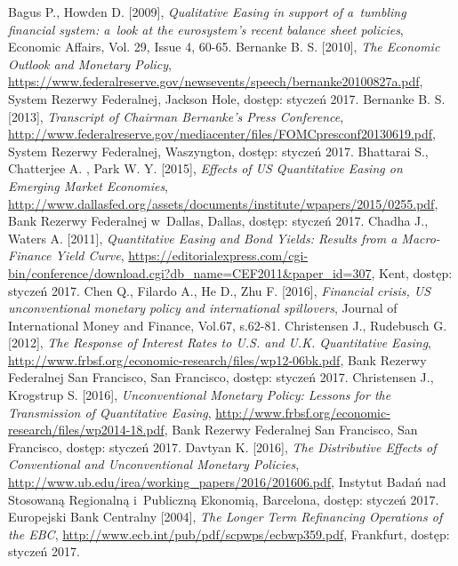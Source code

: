 \begin{thebibliography}{7}
	Bagus P., Howden D. [2009], 
	\emph{Qualitative Easing in support of a~tumbling financial system: a~look at the eurosystem's recent balance sheet policies}, Economic Affairs, Vol. 29, Issue 4, 60-65.	 
	Bernanke B. S. [2010],
	\emph{The Economic Outlook and Monetary Policy}, \url{https://www.federalreserve.gov/newsevents/speech/bernanke20100827a.pdf},
	 System Rezerwy Federalnej, Jackson Hole, dostęp: styczeń 2017.
	Bernanke B. S. [2013],
	\emph{Transcript of Chairman Bernanke’s Press Conference}, \url{http://www.federalreserve.gov/mediacenter/files/FOMCpresconf20130619.pdf},
	 System Rezerwy Federalnej, Waszyngton, dostęp: styczeń 2017.
	Bhattarai S., Chatterjee A. , Park W. Y. [2015], 
\emph{Effects of US Quantitative Easing on Emerging Market Economies},  \url{http://www.dallasfed.org/assets/documents/institute/wpapers/2015/0255.pdf}, Bank Rezerwy Federalnej w~Dallas, Dallas, dostęp: styczeń 2017.
	Chadha J., Waters A. [2011],
	\emph{Quantitative Easing and Bond Yields: Results from a Macro-Finance Yield Curve}, \url{https://editorialexpress.com/cgi-bin/conference/download.cgi?db_name=CEF2011&paper_id=307}, Kent, dostęp: styczeń 2017.
Chen Q., Filardo A., He D., Zhu F. [2016],
\emph{Financial crisis, US unconventional monetary policy and international spillovers}, Journal of International Money and Finance, Vol.67, s.62-81.
	Christensen J., Rudebusch G. [2012],
	\emph{The Response of Interest Rates to U.S. and U.K. Quantitative Easing}, \url{http://www.frbsf.org/economic-research/files/wp12-06bk.pdf}, Bank Rezerwy Federalnej San Francisco, San Francisco, dostęp: styczeń 2017.	
Christensen J., Krogstrup S. [2016], 
\emph{Unconventional Monetary Policy: Lessons for the Transmission of Quantitative Easing}, \url{http://www.frbsf.org/economic-research/files/wp2014-18.pdf}, Bank Rezerwy Federalnej San Francisco, San Francisco, dostęp: styczeń 2017.
Davtyan K. [2016], 
\emph{The Distributive Effects of Conventional and Unconventional Monetary Policies}, \url{http://www.ub.edu/irea/working_papers/2016/201606.pdf}, Instytut Badań nad Stosowaną Regionalną i~Publiczną Ekonomią, Barcelona, dostęp: styczeń 2017.	
Europejski Bank Centralny [2004], \textit{The Longer Term Refinancing Operations of the EBC}, \url{http://www.ecb.int/pub/pdf/scpwps/ecbwp359.pdf}, Frankfurt, dostęp: styczeń 2017.

\end{thebibliography}
